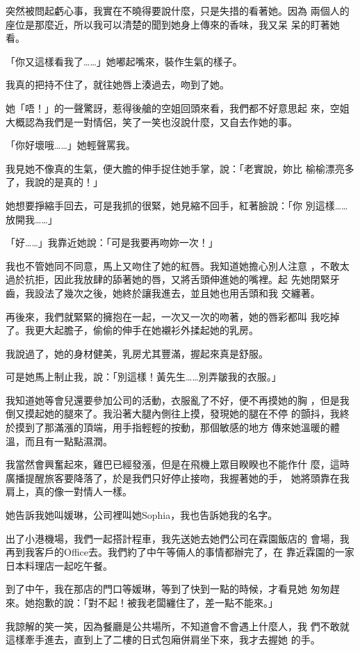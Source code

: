 突然被問起虧心事，我實在不曉得要說什麼，只是失措的看著她。因為
兩個人的座位是那麼近，所以我可以清楚的聞到她身上傳來的香味，我又呆
呆的盯著她看。

「你又這樣看我了……」她嘟起嘴來，裝作生氣的樣子。

我真的把持不住了，就往她唇上湊過去，吻到了她。

她「唔！」的一聲驚訝，惹得後艙的空姐回頭來看，我們都不好意思起
來，空姐大概認為我們是一對情侶，笑了一笑也沒說什麼，又自去作她的事。

「你好壞哦……」她輕聲罵我。

我見她不像真的生氣，便大膽的伸手捉住她手掌，說：「老實說，妳比
榆榆漂亮多了，我說的是真的！」


她想要掙縮手回去，可是我抓的很緊，她見縮不回手，紅著臉說：「你
別這樣……放開我……」

「好……」我靠近她說：「可是我要再吻妳一次！」

我也不管她同不同意，馬上又吻住了她的紅唇。我知道她擔心別人注意
，不敢太過於抗拒，因此我放肆的舔著她的唇，又將舌頭伸進她的嘴裡。起
先她閉緊牙齒，我設法了幾次之後，她終於讓我進去，並且她也用舌頭和我
交纏著。

再後來，我們就緊緊的擁抱在一起，一次又一次的吻著，她的唇彩都叫
我吃掉了。我更大起膽子，偷偷的伸手在她襯衫外揉起她的乳房。

我說過了，她的身材健美，乳房尤其豐滿，握起來真是舒服。

可是她馬上制止我，說：「別這樣！黃先生……別弄皺我的衣服。」

我知道她等會兒還要參加公司的活動，衣服亂了不好，便不再摸她的胸
，但是我倒又摸起她的腿來了。我沿著大腿內側往上摸，發現她的腿在不停
的顫抖，我終於摸到了那滿漲的頂端，用手指輕輕的按動，那個敏感的地方
傳來她溫暖的體溫，而且有一點點濕潤。

我當然會興奮起來，雞巴已經發漲，但是在飛機上眾目睽睽也不能作什
麼，這時廣播提醒旅客要降落了，於是我們只好停止接吻，我握著她的手，
她將頭靠在我肩上，真的像一對情人一樣。

她告訴我她叫媛琳，公司裡叫她Sophia，我也告訴她我的名字。

出了小港機場，我們一起搭計程車，我先送她去她們公司在霖園飯店的
會場，我再到我客戶的Office去。我們約了中午等倆人的事情都辦完了，在
靠近霖園的一家日本料理店一起吃午餐。

到了中午，我在那店的門口等媛琳，等到了快到一點的時候，才看見她
匆匆趕來。她抱歉的說：「對不起！被我老闆纏住了，差一點不能來。」

我諒解的笑一笑，因為餐廳是公共場所，不知道會不會遇上什麼人，我
們不敢就這樣牽手進去，直到上了二樓的日式包廂併肩坐下來，我才去握她
的手。

